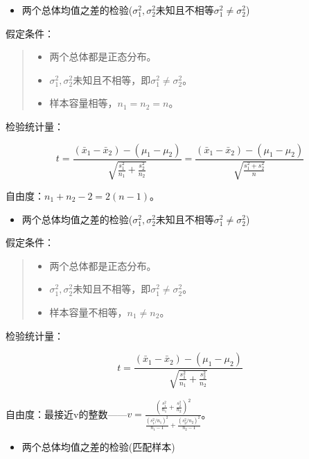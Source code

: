 \documentclass[]{ctexbook}
\providecommand{\tightlist}{%
  \setlength{\itemsep}{0pt}\setlength{\parskip}{0pt}}
\begin{document}
\begin{itemize}
\tightlist
\item
  两个总体均值之差的检验(\(\sigma_1^2,\sigma_2^2\)未知且不相等\(\sigma_1^2\ne\sigma_2^2\))
\end{itemize}

假定条件：

\begin{quote}
\begin{itemize}
\tightlist
\item
  两个总体都是正态分布。
\item
  \(\sigma_1^2,\sigma_2^2\)未知且不相等，即\(\sigma_1^2\ne\sigma_2^2\)。
\item
  样本容量相等，\(n_1=n_2=n\)。
\end{itemize}
\end{quote}

检验统计量：

\[t=\frac{(\bar x_1-\bar x_2)-(\mu_1-\mu_2)}{\sqrt{\frac{s_1^2}{n_1}+\frac{s_2^2}{n_2}}}=\frac{(\bar x_1-\bar x_2)-(\mu_1-\mu_2)}{\sqrt{\frac{s_1^2+s_2^2}{n}}}\]

自由度：\(n_1+n_2-2=2(n-1)\)。

\begin{itemize}
\tightlist
\item
  两个总体均值之差的检验(\(\sigma_1^2,\sigma_2^2\)未知且不相等\(\sigma_1^2\ne\sigma_2^2\))
\end{itemize}

假定条件：

\begin{quote}
\begin{itemize}
\tightlist
\item
  两个总体都是正态分布。
\item
  \(\sigma_1^2,\sigma_2^2\)未知且不相等，即\(\sigma_1^2\ne\sigma_2^2\)。
\item
  样本容量不相等，\(n_1\ne n_2\)。
\end{itemize}
\end{quote}

检验统计量：

\[t=\frac{(\bar x_1-\bar x_2)-(\mu_1-\mu_2)}{\sqrt{\frac{s_1^2}{n_1}+\frac{s_2^2}{n_2}}}\]

自由度：最接近v的整数------\(v=\frac{(\frac{s_1^2}{n_1}+\frac{s_2^2}{n_2})^2}{\frac{(s_1^2/n_1)^2}{n_1-1}+\frac{(s_2^2/n_2)^2}{n_2-1}}\)。

\begin{itemize}
\tightlist
\item
  两个总体均值之差的检验(匹配样本)
\end{itemize}
\end{document}
